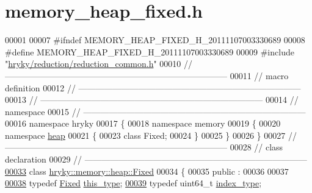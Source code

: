 \hypertarget{memory__heap__fixed_8h_source}{\section{memory\-\_\-heap\-\_\-fixed.\-h}
}

\begin{DoxyCode}
00001 
00007 \textcolor{preprocessor}{#ifndef MEMORY\_HEAP\_FIXED\_H\_20111107003330689}
00008 \textcolor{preprocessor}{}\textcolor{preprocessor}{#define MEMORY\_HEAP\_FIXED\_H\_20111107003330689}
00009 \textcolor{preprocessor}{}\textcolor{preprocessor}{#include "\hyperlink{reduction__common_8h}{hryky/reduction/reduction_common.h}"}
00010 \textcolor{comment}{//
      ------------------------------------------------------------------------------}
00011 \textcolor{comment}{// macro definition}
00012 \textcolor{comment}{//
      ------------------------------------------------------------------------------}
00013 \textcolor{comment}{//
      ------------------------------------------------------------------------------}
00014 \textcolor{comment}{// namespace}
00015 \textcolor{comment}{//
      ------------------------------------------------------------------------------}
00016 \textcolor{keyword}{namespace }hryky
00017 \{
00018 \textcolor{keyword}{namespace }memory
00019 \{
00020 \textcolor{keyword}{namespace }\hyperlink{namespacehryky_1_1memory_1_1global_a6fc6103f67c837aa0f39b359588409cd}{heap}
00021 \{
00023     \textcolor{keyword}{class }Fixed;
00024 \}
00025 \}
00026 \}
00027 \textcolor{comment}{//
      ------------------------------------------------------------------------------}
00028 \textcolor{comment}{// class declaration}
00029 \textcolor{comment}{//
      ------------------------------------------------------------------------------}
\hypertarget{memory__heap__fixed_8h_source_l00033}{}\hyperlink{classhryky_1_1memory_1_1heap_1_1_fixed}{00033} \textcolor{comment}{}\textcolor{keyword}{class }\hyperlink{classhryky_1_1memory_1_1heap_1_1_fixed}{hryky::memory::heap::Fixed}
00034 \{
00035 \textcolor{keyword}{public} :
00036 
00037     
\hypertarget{memory__heap__fixed_8h_source_l00038}{}\hyperlink{classhryky_1_1memory_1_1heap_1_1_fixed_aa25fb42c495f84747ede7cd1ccf1116b}{00038}     \textcolor{keyword}{typedef} \hyperlink{classhryky_1_1memory_1_1heap_1_1_fixed}{Fixed}       \hyperlink{classhryky_1_1memory_1_1heap_1_1_fixed_aa25fb42c495f84747ede7cd1ccf1116b}{this_type};  
\hypertarget{memory__heap__fixed_8h_source_l00039}{}\hyperlink{classhryky_1_1memory_1_1heap_1_1_fixed_a5031234bccd24fe2b2ea6ff6ae5cdcdd}{00039}     \textcolor{keyword}{typedef} uint64\_t    \hyperlink{classhryky_1_1memory_1_1heap_1_1_fixed_a5031234bccd24fe2b2ea6ff6ae5cdcdd}{index_type}; 

\end{DoxyCode}
